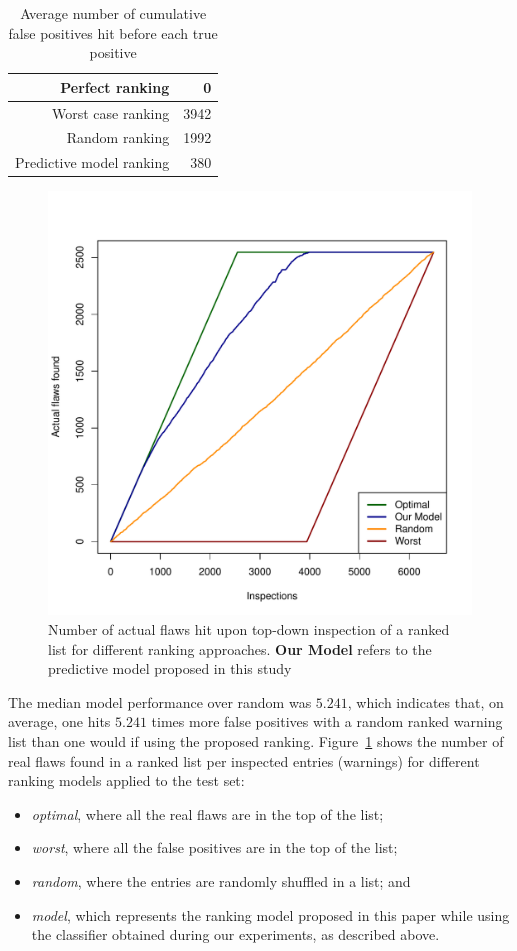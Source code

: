   \begin{table}
    \begin{center}
        \begin{tabular}{|r|r|}
          \hline
          Perfect ranking & 0 \\
          \hline
          Worst case ranking &  3942 \\
          \hline
          Random ranking & 1992 \\
          \hline
          Predictive model ranking & 380 \\
          \hline
        \end{tabular}
        \caption{Average number of cumulative false positives hit before each true positive}\label{tab:avgfp}
    \end{center}
\end{table}


\begin{figure}
\centering
\includegraphics[width=.45\textwidth]{figures/inspections.pdf}
  \caption{Number of actual flaws hit upon top-down inspection of a ranked list for different ranking approaches. \textbf{Our Model} refers to the predictive model proposed in this study}\label{fig:inspections}
\end{figure}

The median model performance over random was $5.241$, which indicates that, on
average, one hits $5.241$ times more false positives with a random ranked
warning list than one would if using the proposed ranking.
Figure~\ref{fig:inspections} shows the number of real flaws found in a ranked
list per inspected entries (warnings) for different ranking models applied to
the test set:

\begin{itemize}
\item\textit{optimal}, where all the real flaws are in the top of the list;
\item\textit{worst}, where all the false positives are in the top of the list;
\item\textit{random}, where the entries are randomly shuffled in a list; and
\item\textit{model}, which represents the ranking model proposed in this paper while
using the classifier obtained during our experiments, as described above.
\end{itemize}

